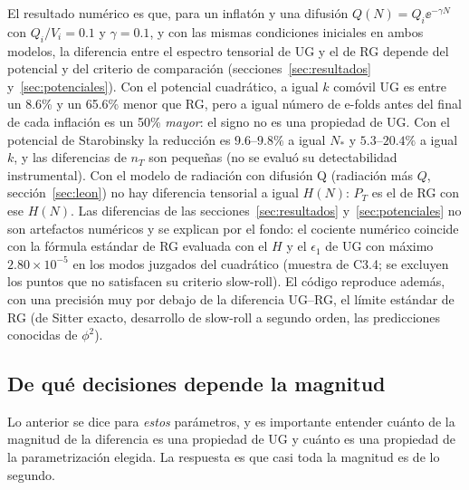 El resultado numérico es que, para un inflatón y una difusión $Q(N)=Q_i\ee^{-\gamma N}$ con $Q_i/V_i=0.1$ y $\gamma=0.1$, y con las mismas condiciones iniciales en ambos modelos, la diferencia entre el espectro tensorial de UG y el de RG depende del potencial y del criterio de comparación (secciones~\ref{sec:resultados} y~\ref{sec:potenciales}). Con el potencial cuadrático, a igual $k$ comóvil UG es entre un 8.6\% y un 65.6\% menor que RG, pero a igual número de e-folds antes del final de cada inflación es un 50\% \emph{mayor}: el signo no es una propiedad de UG. Con el potencial de Starobinsky la reducción es $9.6$--$9.8\%$ a igual $N_*$ y $5.3$--$20.4\%$ a igual $k$, y las diferencias de $n_T$ son pequeñas (no se evaluó su detectabilidad instrumental). Con el modelo de radiación con difusión Q \cite{leon22,piccirilli23} (radiación más $Q$, sección~\ref{sec:leon}) no hay diferencia tensorial a igual $H(N)$: $P_T$ es el de RG con ese $H(N)$. Las diferencias de las secciones~\ref{sec:resultados} y~\ref{sec:potenciales} no son artefactos numéricos y se explican por el fondo: el cociente numérico coincide con la fórmula estándar de RG evaluada con el $H$ y el $\epsilon_1$ de UG con máximo $2.80\times10^{-5}$ en los modos juzgados del cuadrático (muestra de C3.4; se excluyen los puntos que no satisfacen su criterio slow-roll). El código reproduce además, con una precisión muy por debajo de la diferencia UG--RG, el límite estándar de RG (de Sitter exacto, desarrollo de slow-roll a segundo orden, las predicciones conocidas de $\phi^2$).

\subsection{De qué decisiones depende la magnitud}
\label{sec:decisiones-dep}

Lo anterior se dice para \emph{estos} parámetros, y es importante entender cuánto de la magnitud de la diferencia es una propiedad de UG y cuánto es una propiedad de la parametrización elegida. La respuesta es que casi toda la magnitud es de lo segundo.

